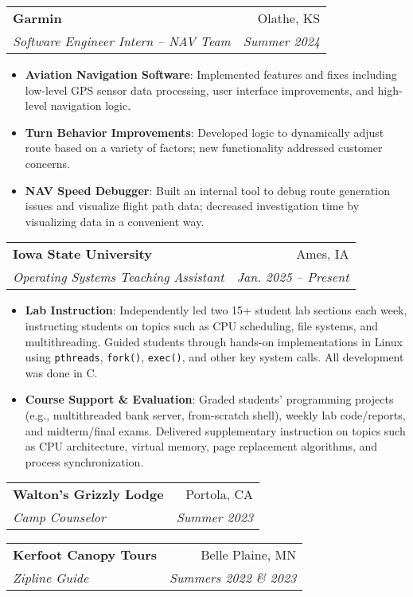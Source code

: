 \documentclass[letterpaper,10pt]{article}
\makeatletter
\newcommand{\resumeItem}[2]{
  \item\small{
    \textbf{#1}{: #2 \vspace{-2pt}}
  }
}
\newcommand{\resumeSubheading}[4]{
  \vspace{-1pt}\item
    \begin{tabular*}{0.97\textwidth}[t]{l@{\extracolsep{\fill}}r}
      \textbf{#1} & #2 \\
      \textit{\small#3} & \textit{\small #4} \\
    \end{tabular*}\vspace{-5pt}
}
\newcommand{\resumeItemListStart}{\begin{itemize}}
\newcommand{\resumeItemListEnd}{\end{itemize}\vspace{-5pt}}
\makeatother
\begin{document}
    \resumeSubheading
      {Garmin}{Olathe, KS}
      {Software Engineer Intern -- NAV Team}{Summer 2024}
      \resumeItemListStart
        \resumeItem{Aviation Navigation Software}
          {Implemented features and fixes including low-level GPS sensor data processing, user interface improvements, and high-level navigation logic.}
        \resumeItem{Turn Behavior Improvements}
          {Developed logic to dynamically adjust route based on a variety of factors; new functionality addressed customer concerns.}
        \resumeItem{NAV Speed Debugger}
          {Built an internal tool to debug route generation issues and visualize flight path data; decreased investigation time by visualizing data in a convenient way.}
      \resumeItemListEnd

    \resumeSubheading
        {Iowa State University}{Ames, IA}
        {Operating Systems Teaching Assistant}{Jan. 2025 -- Present}
        \resumeItemListStart
            \resumeItem{Lab Instruction}
            {Independently led two 15+ student lab sections each week, instructing students on topics such as CPU scheduling, file systems, and multithreading. Guided students through hands-on implementations in Linux using \texttt{pthreads}, \texttt{fork()}, \texttt{exec()}, and other key system calls. All development was done in C.}
            \resumeItem{Course Support \& Evaluation}
            {Graded students' programming projects (e.g., multithreaded bank server, from-scratch shell), weekly lab code/reports, and midterm/final exams. Delivered supplementary instruction on topics such as CPU architecture, virtual memory, page replacement algorithms, and process synchronization.}
        \resumeItemListEnd

    \resumeSubheading
      {Walton's Grizzly Lodge}{Portola, CA}
      {Camp Counselor}{Summer 2023}
    
    \resumeSubheading
      {Kerfoot Canopy Tours}{Belle Plaine, MN}
      {Zipline Guide}{Summers 2022 \& 2023}
\end{document}
